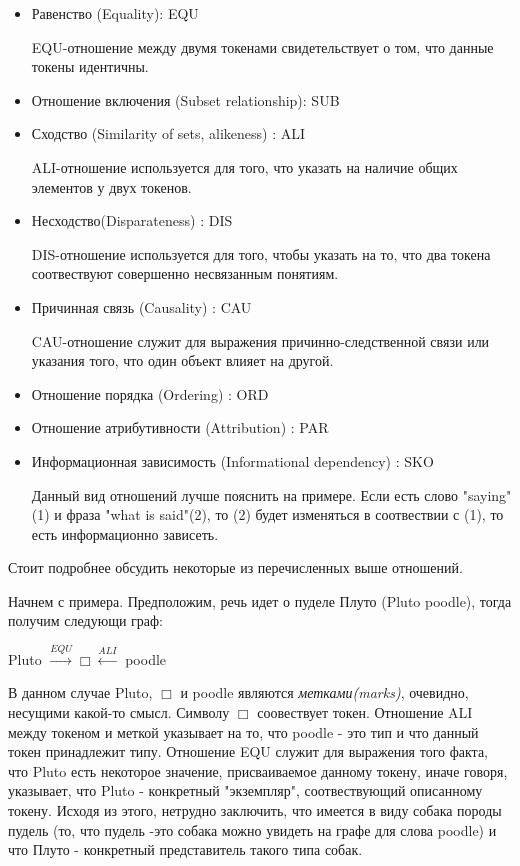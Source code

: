 \begin{itemize}

\item{
Равенство (Equality): EQU

EQU-отношение между двумя токенами свидетельствует о том, 
что данные токены идентичны.
}

\item {
Отношение включения (Subset relationship): SUB

}

\item{
Сходство (Similarity of sets, alikeness) : ALI

ALI-отношение используется для того, что указать на наличие общих
элементов у двух токенов.
}

\item{
Несходство(Disparateness) : DIS

DIS-отношение используется для того, чтобы указать на то, что
два токена соотвествуют совершенно несвязанным понятиям.
}

\item{
Причинная связь (Causality) : CAU

CAU-отношение служит для выражения причинно-следственной связи или
указания того, что один объект влияет на другой. 
}

\item{
Отношение порядка (Ordering) : ORD  
}

\item{
Отношение атрибутивности (Attribution) : PAR
}

\item{
Информационная зависимость (Informational dependency) : SKO

Данный вид отношений лучше пояснить на примере. Если есть слово "saying"(1)
и фраза "what is said"(2), то (2) будет изменяться в соотвествии с (1), то есть
информационно зависеть.
}
\end{itemize}

Стоит подробнее обсудить некоторые из перечисленных выше отношений. 

Начнем с примера. Предположим, речь идет о пуделе Плуто (Pluto poodle),
 тогда получим следующи граф:

Pluto $\xrightarrow{EQU} \Box \xleftarrow{ALI}$ poodle 

В данном случае Pluto, $\Box$ и poodle являются \textsl{метками(marks)}, очевидно, несущими 
какой-то смысл. Символу $\Box$ соовествует токен. Отношение ALI между токеном и меткой указывает
на то, что poodle - это тип и что данный токен принадлежит типу. Отношение EQU служит для выражения
того факта, что Pluto есть некоторое значение, присваиваемое данному токену, иначе говоря, указывает,
что Pluto - конкретный "экземпляр", соотвествующий описанному токену. Исходя из этого, нетрудно заключить,
что имеется в виду собака породы пудель (то, что пудель -это собака можно увидеть на графе для слова
 poodle) и что Плуто - конкретный представитель такого типа собак.

